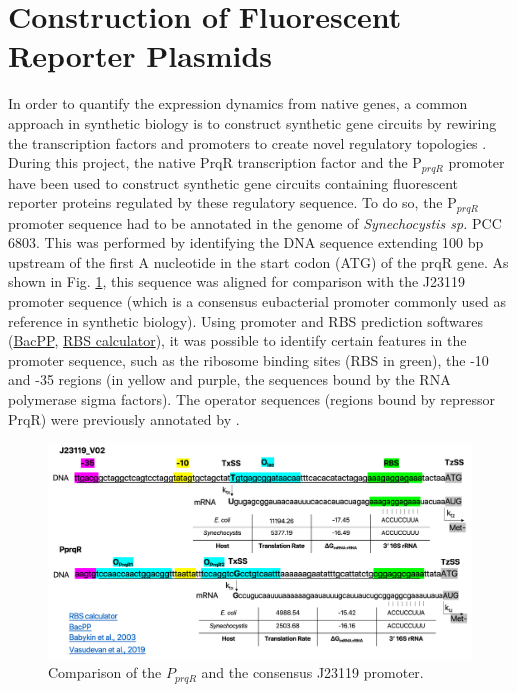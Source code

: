 \section{Construction of Fluorescent Reporter Plasmids}
In order to quantify the expression dynamics from native genes, a common approach in synthetic biology is to construct synthetic gene circuits by rewiring the  transcription factors and promoters to create novel regulatory topologies \citep{Chen2018}. During this project, the native PrqR transcription factor and the P$_{prqR}$ promoter have been used to construct synthetic gene circuits containing fluorescent reporter proteins regulated by these regulatory sequence.
To do so, the P$_{prqR}$ promoter sequence had to be annotated in the genome of \textit{Synechocystis sp.} PCC 6803. This was performed by identifying the DNA sequence extending 100 bp upstream of the first A nucleotide in the start codon (ATG) of the prqR gene. As shown in Fig. \ref{fig:promoteranal}, this sequence was aligned for comparison with the J23119 promoter sequence (which is a consensus eubacterial promoter commonly used as reference in synthetic biology). Using promoter and RBS prediction softwares (\href{http://www.bacpp.bioinfoucs.com/home}{BacPP}, \href{https://salislab.net/software/}{RBS calculator}), it was possible to identify certain features in the promoter sequence, such as the ribosome binding sites (RBS in green), the -10 and -35 regions (in yellow and purple, the sequences bound by the RNA polymerase sigma factors). The operator sequences (regions bound by repressor PrqR) were previously annotated by \citep{Babykin2003}.

\begin{figure}[H]
    \centering
    \includegraphics[width=\hsize]{figs/promoters.png}
    \caption{Comparison of the $P_{prqR}$ and the consensus J23119 promoter.}
    \label{fig:promoteranal}
\end{figure}

